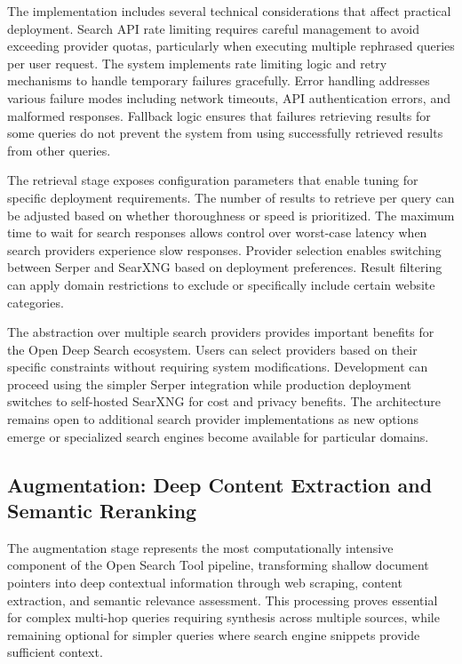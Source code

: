 The implementation includes several technical considerations that affect practical deployment. Search API rate limiting requires careful management to avoid exceeding provider quotas, particularly when executing multiple rephrased queries per user request. The system implements rate limiting logic and retry mechanisms to handle temporary failures gracefully. Error handling addresses various failure modes including network timeouts, API authentication errors, and malformed responses. Fallback logic ensures that failures retrieving results for some queries do not prevent the system from using successfully retrieved results from other queries.

The retrieval stage exposes configuration parameters that enable tuning for specific deployment requirements. The number of results to retrieve per query can be adjusted based on whether thoroughness or speed is prioritized. The maximum time to wait for search responses allows control over worst-case latency when search providers experience slow responses. Provider selection enables switching between Serper and SearXNG based on deployment preferences. Result filtering can apply domain restrictions to exclude or specifically include certain website categories.

The abstraction over multiple search providers provides important benefits for the Open Deep Search ecosystem. Users can select providers based on their specific constraints without requiring system modifications. Development can proceed using the simpler Serper integration while production deployment switches to self-hosted SearXNG for cost and privacy benefits. The architecture remains open to additional search provider implementations as new options emerge or specialized search engines become available for particular domains.

\subsection{Augmentation: Deep Content Extraction and Semantic Reranking}

The augmentation stage represents the most computationally intensive component of the Open Search Tool pipeline, transforming shallow document pointers into deep contextual information through web scraping, content extraction, and semantic relevance assessment. This processing proves essential for complex multi-hop queries requiring synthesis across multiple sources, while remaining optional for simpler queries where search engine snippets provide sufficient context.

